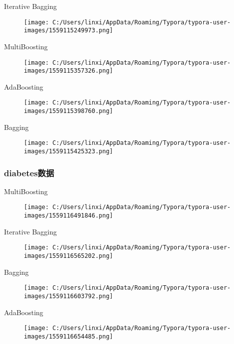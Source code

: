\documentclass[]{article}
\date{}
\begin{document}
Iterative Bagging

\begin{figure}
\centering
\texttt{[image: C:/Users/linxi/AppData/Roaming/Typora/typora-user-images/1559115249973.png]}
\caption{}
\end{figure}

MultiBoosting

\begin{figure}
\centering
\texttt{[image: C:/Users/linxi/AppData/Roaming/Typora/typora-user-images/1559115357326.png]}
\caption{}
\end{figure}

AdaBoosting

\begin{figure}
\centering
\texttt{[image: C:/Users/linxi/AppData/Roaming/Typora/typora-user-images/1559115398760.png]}
\caption{}
\end{figure}

Bagging

\begin{figure}
\centering
\texttt{[image: C:/Users/linxi/AppData/Roaming/Typora/typora-user-images/1559115425323.png]}
\caption{}
\end{figure}

\subsubsection{diabetes数据}\label{header-n17}

MultiBoosting

\begin{figure}
\centering
\texttt{[image: C:/Users/linxi/AppData/Roaming/Typora/typora-user-images/1559116491846.png]}
\caption{}
\end{figure}

Iterative Bagging

\begin{figure}
\centering
\texttt{[image: C:/Users/linxi/AppData/Roaming/Typora/typora-user-images/1559116565202.png]}
\caption{}
\end{figure}

Bagging

\begin{figure}
\centering
\texttt{[image: C:/Users/linxi/AppData/Roaming/Typora/typora-user-images/1559116603792.png]}
\caption{}
\end{figure}

AdaBoosting

\begin{figure}
\centering
\texttt{[image: C:/Users/linxi/AppData/Roaming/Typora/typora-user-images/1559116654485.png]}
\caption{}
\end{figure}
\end{document}
